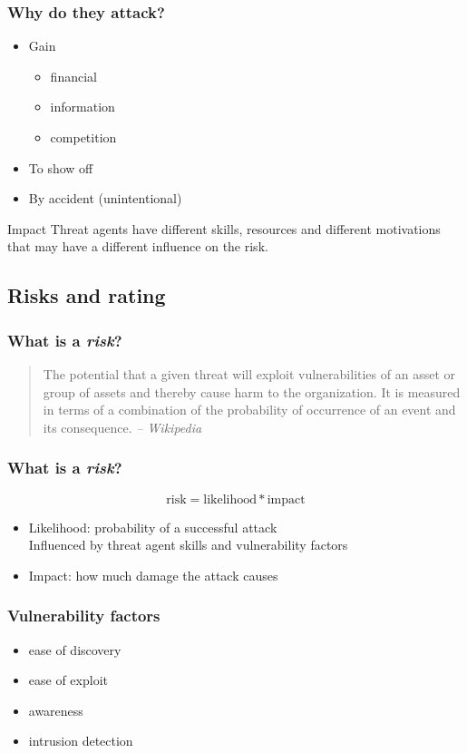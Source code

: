 \begin{frame}
\frametitle{Why do they attack?}
\begin{itemize}
\item Gain
	\begin{itemize}
	\item financial
	\item information
	\item competition
	\end{itemize}
\item To show off
\item By accident (unintentional)
\end{itemize}
\begin{block}{Impact}
Threat agents have different skills, resources and different motivations that
may have a different influence on the risk. %
\end{block}
\end{frame}

\subsection{Risks and rating}

\begin{frame}
\frametitle{What is a \emph{risk}?}
\begin{quote}
The potential that a given threat will exploit vulnerabilities of
an asset or group of assets and thereby cause harm to the organization. It
is measured in terms of a combination of the probability of occurrence of an
event and its consequence.
\textit{-- Wikipedia}
\end{quote}
\end{frame}

\begin{frame}
\frametitle{What is a \emph{risk}?}
\[ \text{risk} = \text{likelihood} * \text{impact} \]
\begin{itemize}
\item Likelihood: probability of a successful attack
	\\ Influenced by threat agent skills and vulnerability factors
\item Impact: how much damage the attack causes
\end{itemize}
\end{frame}

\begin{frame}
\frametitle{Vulnerability factors}
\begin{itemize}
\item ease of discovery
\item ease of exploit
\item awareness
\item intrusion detection
\end{itemize}
\end{frame}

